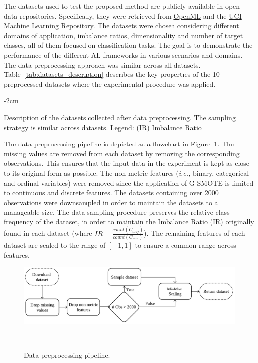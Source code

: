 \documentclass[parskip=full]{scrartcl}
\begin{document}
The datasets used to test the proposed method are publicly available in open
data repositories. Specifically, they were retrieved from
\href{https://www.openml.org/}{OpenML} and the
\href{https://archive.ics.uci.edu/}{UCI Machine Learning Repository}. The
datasets were chosen considering different domains of application, imbalance
ratios, dimensionality and number of target classes, all of them focused on
classification tasks. The goal is to demonstrate the performance of the
different AL frameworks in various scenarios and domains. The data
preprocessing approach was similar across all datasets.
Table~\ref{tab:datasets_description} describes the key properties of the 10
preprocessed datasets where the experimental procedure was applied. 

\begin{table}[H]
    \centering
    \addtolength{\leftskip} {-2cm}
    \addtolength{\rightskip}{-2cm}
    \caption{\label{tab:datasets_description}
        Description of the datasets collected after data preprocessing. The
        sampling strategy is similar across datasets. Legend: (IR) Imbalance
        Ratio
    }
\end{table}

The data preprocessing pipeline is depicted as a flowchart in
Figure~\ref{fig:data_preprocessing}. The missing values are removed from each
dataset by removing the corresponding observations. This ensures that the
input data in the experiment is kept as close to its original form as
possible. The non-metric features (\textit{i.e.,} binary, categorical and
ordinal variables) were removed since the application of G-SMOTE is limited to
continuous and discrete features. The datasets containing over 2000
observations were downsampled in order to maintain the datasets to a
manageable size. The data sampling procedure preserves the relative class
frequency of the dataset, in order to maintain the Imbalance Ratio (IR)
originally found in each dataset (where $IR =
\frac{count(C_{maj})}{count(C_{\min})}$). The remaining features of each
dataset are scaled to the range of $[-1, 1]$ to ensure a common range across
features.

\begin{figure}[H]
	\centering
	\includegraphics[width=1\linewidth]{../analysis/data_preprocessing}
    \caption{%
        Data preprocessing pipeline.
    }~\label{fig:data_preprocessing}
\end{figure}
\end{document}
